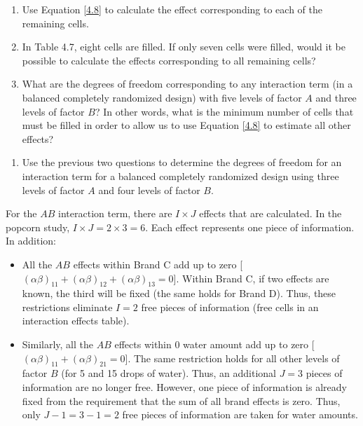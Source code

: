 \documentclass[
]{report}
\providecommand{\tightlist}{%
  \setlength{\itemsep}{0pt}\setlength{\parskip}{0pt}}
\begin{document}
\begin{enumerate}
\def\labelenumi{\alph{enumi}.}
\item
  Use Equation \ref{4.8} to calculate the effect corresponding to each of the remaining cells.
\item
  In Table 4.7, eight cells are filled. If only seven cells were filled, would it be possible to calculate the effects corresponding to all remaining cells?
\item
  What are the degrees of freedom corresponding to any interaction term (in a balanced completely randomized design) with five levels of factor \(A\) and three levels of factor \(B\)? In other words, what is the minimum number of cells that must be filled in order to allow us to use Equation \ref{4.8} to estimate all other effects?
\end{enumerate}

\begin{enumerate}
\def\labelenumi{\arabic{enumi}.}
\setcounter{enumi}{32}
\tightlist
\item
  Use the previous two questions to determine the degrees of freedom for an interaction term for a balanced completely randomized design using three levels of factor \(A\) and four levels of factor \(B\).
\end{enumerate}

For the \(AB\) interaction term, there are \(I \times J\) effects that are calculated. In the popcorn study, \(I \times J = 2 \times 3 = 6\). Each effect represents one piece of information. In addition:

\begin{itemize}
\tightlist
\item
  All the \(AB\) effects within Brand C add up to zero {[}\((\alpha\beta)_{11} + (\alpha\beta)_{12} + (\alpha\beta)_{13} = 0\){]}. Within Brand C, if two effects are known, the third will be fixed (the same holds for Brand D). Thus, these restrictions eliminate \(I = 2\) free pieces of information (free cells in an interaction effects table).
\item
  Similarly, all the \(AB\) effects within 0 water amount add up to zero {[}\((\alpha\beta)_{11} + (\alpha\beta)_{21} = 0\){]}. The same restriction holds for all other levels of factor \(B\) (for 5 and 15 drops of water). Thus, an additional \(J = 3\) pieces of information are no longer free. However, one piece of information is already fixed from the requirement that the sum of all brand effects is zero. Thus, only \(J-1 = 3-1=2\) free pieces of information are taken for water amounts.
\end{itemize}
\end{document}
